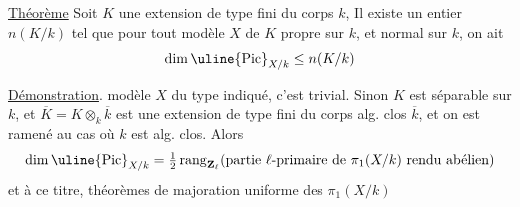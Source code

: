\uline{Théorème} Soit $K$ une extension de type fini du
corps $k$, 
 Il
existe un entier $n(K/k)$
tel que pour tout modèle $X$ de $K$ propre sur $k$, et
normal sur $k$,  on ait 
\[
\dim\uline{\mathrm{Pic}}_{X/k}\leq n(K/k)
\]

\uline{Démonstration}. 
modèle $X$ du type indiqué, c'est trivial.
Sinon $K$ est séparable sur $k$, et
$\overline K=K\otimes_k\overline k$ est une extension de type
fini du corps alg. clos $\overline k$, et on
est ramené au cas où $k$ est alg. clos.
Alors
\[
\dim\uline{\mathrm{Pic}}_{X/k}
=\tfrac12\operatorname{rang}_{\mathbf Z_\ell}
(\text{partie $\ell$-primaire de }\pi_1(X/k)\text{ rendu abélien})
\]
et à ce titre,  théorèmes
de majoration uniforme des $\pi_1(X/k)$
